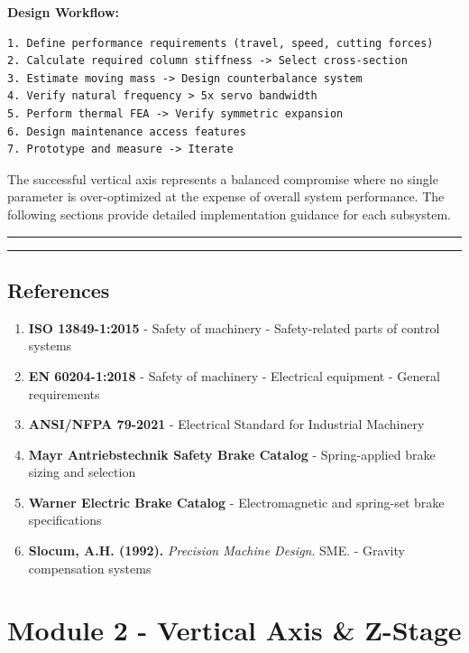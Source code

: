 \documentclass[
]{article}
\providecommand{\tightlist}{%
  \setlength{\itemsep}{0pt}\setlength{\parskip}{0pt}}
\begin{document}
\textbf{Design Workflow:}

\begin{verbatim}
1. Define performance requirements (travel, speed, cutting forces)
2. Calculate required column stiffness -> Select cross-section
3. Estimate moving mass -> Design counterbalance system
4. Verify natural frequency > 5x servo bandwidth
5. Perform thermal FEA -> Verify symmetric expansion
6. Design maintenance access features
7. Prototype and measure -> Iterate
\end{verbatim}

The successful vertical axis represents a balanced compromise where no
single parameter is over-optimized at the expense of overall system
performance. The following sections provide detailed implementation
guidance for each subsystem.

\begin{center}\rule{0.5\linewidth}{0.5pt}\end{center}

\begin{center}\rule{0.5\linewidth}{0.5pt}\end{center}

\subsection{References}\label{references}

\begin{enumerate}
\def\labelenumi{\arabic{enumi}.}
\tightlist
\item
  \textbf{ISO 13849-1:2015} - Safety of machinery - Safety-related parts
  of control systems
\item
  \textbf{EN 60204-1:2018} - Safety of machinery - Electrical equipment
  - General requirements
\item
  \textbf{ANSI/NFPA 79-2021} - Electrical Standard for Industrial
  Machinery
\item
  \textbf{Mayr Antriebstechnik Safety Brake Catalog} - Spring-applied
  brake sizing and selection
\item
  \textbf{Warner Electric Brake Catalog} - Electromagnetic and
  spring-set brake specifications
\item
  \textbf{Slocum, A.H. (1992).} \emph{Precision Machine Design}. SME. -
  Gravity compensation systems
\end{enumerate}

\newpage

\section{Module 2 - Vertical Axis \&
Z-Stage}\label{module-2---vertical-axis-z-stage}
\end{document}
